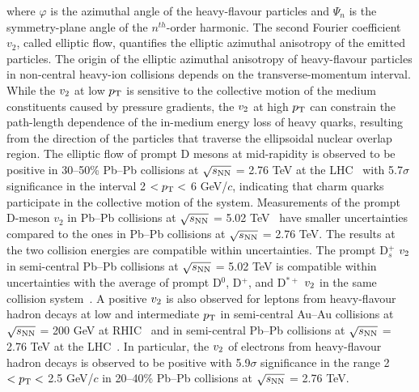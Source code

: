 \documentclass[11pt,a4paper]{article}
\providecommand{\pT}{$p_{\rm T}$ }
\providecommand{\vtwo}{$v_{\rm 2}$ }
\providecommand{\snn}{$\sqrt{s_{\rm NN}}$ }
\begin{document}
\noindent  where $\varphi$ is the azimuthal angle of the heavy-flavour particles and $\Psi_{n}$ is the symmetry-plane angle of the $n^{th}$-order harmonic. 
The second Fourier coefficient $v_2$, called elliptic flow,  quantifies the elliptic azimuthal anisotropy of the emitted particles. 
The origin of the elliptic azimuthal anisotropy of heavy-flavour particles in non-central heavy-ion collisions depends on the transverse-momentum interval. While the \vtwo at low $p_{\rm T}$ is sensitive to the collective motion of the medium constituents caused by pressure gradients, the \vtwo at high $p_{\rm T}$ can constrain the path-length dependence of the in-medium energy loss of heavy quarks, resulting from the direction of the particles that traverse the ellipsoidal nuclear overlap region.
The elliptic flow of prompt D mesons at mid-rapidity is observed to be positive in  30--50\% Pb--Pb collisions at \snn = 2.76 TeV at the LHC~\cite{Abelev:2013lca,Abelev:2014ipa} with 5.7$\sigma$ significance in the interval 2 $< p_{\rm T} <$ 6 GeV/$c$, indicating that charm quarks participate in the collective motion of the system. Measurements of the prompt D-meson $v_2$ in Pb--Pb collisions at \snn = 5.02 TeV~\cite{CMS:2016jtu,Acharya:2017qps} have smaller uncertainties compared to the ones in Pb--Pb collisions at \snn = 2.76 TeV. The results at the two  collision energies are compatible within uncertainties. 
The prompt D$_ {s}^{+}$ \vtwo in semi-central  Pb--Pb collisions at \snn = 5.02 TeV is compatible within uncertainties with the average  of prompt D$^{0}$, D$^{+}$, and D$^{*+}$  \vtwo in the same collision system~\cite{Acharya:2017qps}.
A positive \vtwo is also observed for leptons from heavy-flavour hadron decays at low and intermediate \pT in semi-central Au--Au collisions at \snn = 200 GeV at RHIC~\cite{Adare:2010de,Adamczyk:2014yew} and in semi-central Pb--Pb collisions at \snn = 2.76 TeV at the LHC~\cite{Adam:2016ssk,Adam:2015pga,ATLAS-CONF-2015-053}.  In particular, the \vtwo of electrons from heavy-flavour hadron decays is observed to be positive with 5.9$\sigma$ significance in the range 2 $< p_{\rm T} <$ 2.5 GeV/$c$ in 20--40\%  Pb--Pb collisions at \snn = 2.76 TeV.
\end{document}
